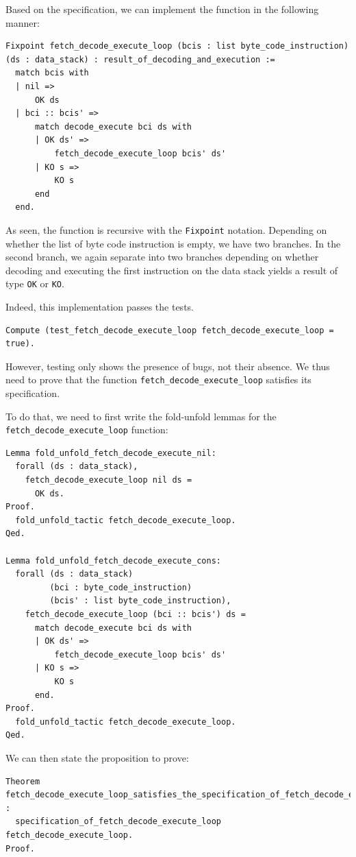 \documentclass{article}
\begin{document}
Based on the specification, we can implement the function in the following manner:

\begin{lstlisting}
Fixpoint fetch_decode_execute_loop (bcis : list byte_code_instruction) (ds : data_stack) : result_of_decoding_and_execution :=
  match bcis with
  | nil =>
      OK ds
  | bci :: bcis' =>
      match decode_execute bci ds with
      | OK ds' =>
          fetch_decode_execute_loop bcis' ds'
      | KO s =>
          KO s
      end
  end.
\end{lstlisting}

As seen, the function is recursive with the \texttt{Fixpoint} notation. Depending on whether the list of byte code instruction is empty, we have two branches. In the second branch, we again separate into two branches depending on whether decoding and executing the first instruction on the data stack yields a result of type \texttt{OK} or \texttt{KO}.

Indeed, this implementation passes the tests.

\begin{lstlisting}
Compute (test_fetch_decode_execute_loop fetch_decode_execute_loop = true).
\end{lstlisting}

However, testing only shows the presence of bugs, not their absence. We thus need to prove that the function \texttt{fetch\_decode\_execute\_loop} satisfies its specification. 

To do that, we need to first write the fold-unfold lemmas for the \texttt{fetch\_decode\_execute\_loop} function:

\begin{lstlisting}
Lemma fold_unfold_fetch_decode_execute_nil:
  forall (ds : data_stack),
    fetch_decode_execute_loop nil ds =
      OK ds.
Proof.
  fold_unfold_tactic fetch_decode_execute_loop.
Qed.

Lemma fold_unfold_fetch_decode_execute_cons:
  forall (ds : data_stack)
         (bci : byte_code_instruction)
         (bcis' : list byte_code_instruction),
    fetch_decode_execute_loop (bci :: bcis') ds =
      match decode_execute bci ds with
      | OK ds' =>
          fetch_decode_execute_loop bcis' ds'
      | KO s =>
          KO s
      end.
Proof.
  fold_unfold_tactic fetch_decode_execute_loop.
Qed.
\end{lstlisting}

We can then state the proposition to prove:

\begin{lstlisting}
Theorem fetch_decode_execute_loop_satisfies_the_specification_of_fetch_decode_execute_loop :
  specification_of_fetch_decode_execute_loop fetch_decode_execute_loop.
Proof.
\end{lstlisting}
\end{document}
